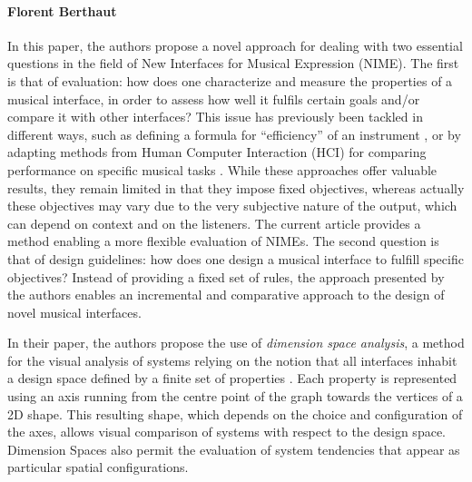 {{\paragraph{Florent Berthaut}

In this paper, the authors propose a novel approach for dealing with two essential questions in the field of New Interfaces for Musical Expression (NIME). The first is that of evaluation: how does one characterize and measure the properties of a musical interface, in order to assess how well it fulfils certain goals and/or compare it with other interfaces? This issue has previously been tackled in different ways, such as defining a formula  for ``efficiency'' of an instrument \cite{Jorda:2003}, or by adapting methods from Human Computer Interaction (HCI) for comparing performance on specific musical tasks \cite{Orio:2002}. While these approaches offer valuable results, they remain limited in that they impose fixed objectives, whereas actually these objectives may vary due to the very subjective nature of the output, which can depend on context and on the listeners. The current article provides a method enabling a more flexible evaluation of NIMEs. The second question is that of design guidelines: how does one design a musical interface to fulfill specific objectives? Instead of providing a fixed set of rules, the approach presented by the authors enables an incremental and comparative approach to the design of novel musical interfaces.

In their paper, the authors propose the use of \emph{dimension space analysis}, a method for the visual analysis of systems relying on the notion that all interfaces inhabit a design space defined by a finite set of properties \cite{Graham:2000}. Each property is represented using an axis running from the centre point of the graph towards the vertices of a 2D shape. This resulting shape, which depends on the choice and configuration of the axes, allows visual comparison of systems with respect to the design space. Dimension Spaces also permit the evaluation of system tendencies that appear as particular spatial configurations.

}}
